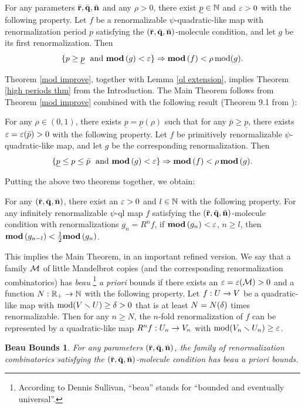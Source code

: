 \begin{thm}\label{mod improve}
For any parameters $\bar{{\mathbf{r}}},\bar{{\mathbf{q}}},\bar{{\mathbf{n}}}$ and any $\rho>0$,
 there exist  ${\underline p} \in {\mathbb N}$ and ${\varepsilon}>0$ with the following property.
Let $f$ be a renormalizable $\psi$-quadratic-like map with renormalization period $p$
satisfying the $(\bar{{\mathbf{r}}}, \bar{{\mathbf{q}}}, \bar{{\mathbf{n}}})$-molecule condition, 
and let $g$ be its first renormalization.
Then 
$$
 \{ p\geq \underline p\ \ \mathrm{and}\ { \mathbf{mod}\, }(g)< {\varepsilon} \}  \Rightarrow { \mathbf{mod}\, } (f) < \rho \operatorname{mod}(g).
$$
\end{thm}


  Theorem \ref{mod improve},
together with Lemma \ref{ql extension}, 
implies Theorem \ref{high periods thm} from the Introduction. 
The Main Theorem  follows from Theorem \ref{mod improve} combined
with the following result  (Theorem 9.1 from \cite{K}): 

\begin{thm}\label{improving mod-2}
For any $\rho\in (0,1)$, there exists $\underline p=\underline p (\rho)$ 
such that for any $\bar p\geq \underline p$, there exists ${\varepsilon}={\varepsilon}(\bar p)>0 $ with the following property.
Let $f$ be primitively renormalizable $\psi$-quadratic-like map, 
and let $g$ be the corresponding renormalization.
Then
$$
   \{\underline p\leq p\leq \bar p\ \ \mathrm{and}\ \psimod(g) < \eps\}   \imply \psimod(f) < \rho\, \psimod(g).
$$
\end{thm} 


Putting the above two theorems together, we obtain:

\begin{cor}\label{improving-3}
 For any $(\bar{{\mathbf{r}}}, \bar{{\mathbf{q}}}, \bar{{\mathbf{n}}})$,   there exist an ${\varepsilon}>0$ and $l\in {\mathbb N}$ with the following property.
For any  infinitely renormalizable $\psi$-ql map $f$ satisfying the  $(\bar{{\mathbf{r}}}, \bar{{\mathbf{q}}}, \bar {{\mathbf{n}}})$-molecule
condition
with renormalizations $g_n=R^n f$,
if ${ \mathbf{mod}\, }(g_n)< {\varepsilon}$, $n\geq l$,  then ${ \mathbf{mod}\, } (g_{n-l})<\frac 1{2} { \mathbf{mod}\, }(g_n)$.
\end{cor}

     
This implies the Main Theorem, in an important refined version.
We say that a family ${\mathcal M}$ of little Mandelbrot copies (and the corresponding
renormalization combinatorics) has {\it beau}%
\footnote{According to Dennis Sullivan, 
   ``beau'' stands for ``bounded and eventually universal''. }
{\it a priori} bounds
if there exists an ${\varepsilon} ={\varepsilon}({\mathcal M})>0$ and a function $N: {\mathbb R}_+\rightarrow {\mathbb N}$
with the following property.
Let $f: U\rightarrow V$ be a quadratic-like map with $\operatorname{mod}(V\smallsetminus U)\geq {\delta}>0$
that is  at least $N=N({\delta})$ times renormalizable. Then for any $n\geq N$,
the $n$-fold renormalization of $f$ can be represented  by a quadratic-like map $R^n f: U_n\rightarrow V_n$ with
$\operatorname{mod}(V_n\smallsetminus U_n)\geq {\varepsilon}$.

\newtheorem*{Beau}{Beau Bounds}  
\begin{Beau}
  For any parameters $(\bar{{\mathbf{r}}}, \bar{{\mathbf{q}}}, \bar{{\mathbf{n}}})$, 
the family of renormalization combinatorics satisfying the  $(\bar{{\mathbf{r}}}, \bar{{\mathbf{q}}}, \bar{{\mathbf{n}}})$-molecule condition has
beau a priori bounds.
\end{Beau}
            









